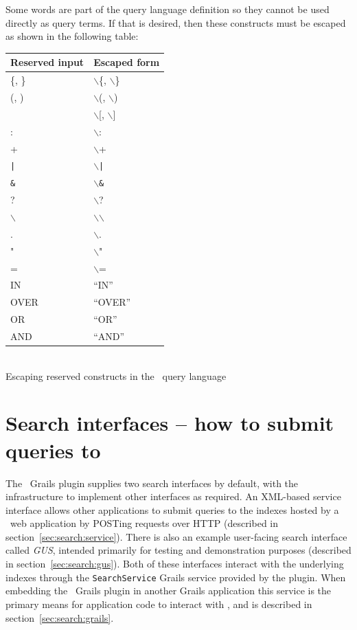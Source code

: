 Some words are part of the query language definition so they cannot be used
directly as query terms. If that is desired, then these constructs must be
escaped as shown in the following table:
\begin{center}
\begin{tabular}{|l|l|}
\hline
{\bf Reserved input} & {\bf Escaped form}\\
\hline \hline
\{, \} &  $\backslash$\{, $\backslash$\}\\
\hline
(, )  & $\backslash$(, $\backslash$) \\
\hline
[, ] & $\backslash$[, $\backslash$]\\
\hline
: &  $\backslash$: \\
\hline
+ &  $\backslash$+ \\
\hline
{\tt |} &  $\backslash${\tt |} \\
\hline
{\tt \&} &  $\backslash${\tt \&} \\
\hline
? &  $\backslash$? \\
\hline
$\backslash$ &  $\backslash$$\backslash$ \\
\hline
. &  $\backslash$. \\
\hline
" &  $\backslash$" \\
\hline 
=  & $\backslash$= \\
\hline
IN & ``IN'' \\
\hline
OVER & ``OVER''\\ 
\hline
OR & ``OR''\\ 
\hline
AND & ``AND''\\ 
\hline
\end{tabular}\\
\vspace{1ex}
Escaping reserved constructs in the \Mimir\ query language
\end{center}


\section{Search interfaces -- how to submit queries to \Mimir}
\label{sec:search:interfaces}

The \Mimir\ Grails plugin supplies two search interfaces by default, with the
infrastructure to implement other interfaces as required.  An XML-based service
interface allows other applications to submit queries to the indexes hosted by
a \Mimir\ web application by POSTing requests over HTTP (described in
section~\ref{sec:search:service}).  There is also an example user-facing search
interface called {\em GUS}, intended primarily for testing and demonstration
purposes (described in section~\ref{sec:search:gus}).  Both of these interfaces
interact with the underlying indexes through the {\tt SearchService} Grails
service provided by the plugin.  When embedding the \Mimir\ Grails plugin in
another Grails application this service is the primary means for application
code to interact with \Mimir, and is described in
section~\ref{sec:search:grails}.

